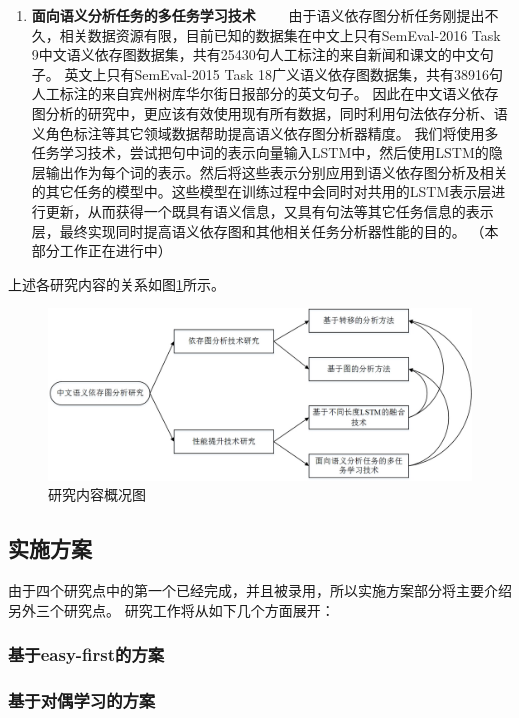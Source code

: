 \begin{enumerate}
	\item \textbf{面向语义分析任务的多任务学习技术}
	\ \ \ \ 由于语义依存图分析任务刚提出不久，相关数据资源有限，目前已知的数据集在中文上只有SemEval-2016 Task 9中文语义依存图数据集，共有25430句人工标注的来自新闻和课文的中文句子。
	英文上只有SemEval-2015 Task 18广义语义依存图数据集，共有38916句人工标注的来自宾州树库华尔街日报部分的英文句子。
	因此在中文语义依存图分析的研究中，更应该有效使用现有所有数据，同时利用句法依存分析、语义角色标注等其它领域数据帮助提高语义依存图分析器精度。
	我们将使用多任务学习技术，尝试把句中词的表示向量输入LSTM中，然后使用LSTM的隐层输出作为每个词的表示。然后将这些表示分别应用到语义依存图分析及相关的其它任务的模型中。这些模型在训练过程中会同时对共用的LSTM表示层进行更新，从而获得一个既具有语义信息，又具有句法等其它任务信息的表示层，最终实现同时提高语义依存图和其他相关任务分析器性能的目的。
	（本部分工作正在进行中）
	
\end{enumerate}

上述各研究内容的关系如图\ref{fig:relation}所示。
\begin{figure}[htbp]
	\centering
	\includegraphics[width = 150mm]{picture/relation.jpg}
	\caption{研究内容概况图}
	\label{fig:relation}
\end{figure}



\subsection{实施方案}
由于四个研究点中的第一个已经完成，并且被录用，所以实施方案部分将主要介绍另外三个研究点。
研究工作将从如下几个方面展开：
\subsubsection{基于easy-first的方案}


\subsubsection{基于对偶学习的方案}


